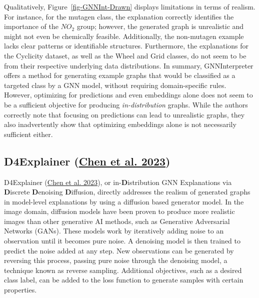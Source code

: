 \documentclass[
  11pt,
  letterpaper,
]{article}
\begin{document}
Qualitatively, Figure~\ref{fig-GNNInt-Drawn} displays limitations in
terms of realism. For instance, for the mutagen class, the explanation
correctly identifies the importance of the \(NO_2\) group; however, the
generated graph is unrealistic and might not even be chemically
feasible. Additionally, the non-mutagen example lacks clear patterns or
identifiable structures. Furthermore, the explanations for the Cyclicity
dataset, as well as the Wheel and Grid classes, do not seem to be from
their respective underlying data distributions. In summary,
GNNInterpreter offers a method for generating example graphs that would
be classified as a targeted class by a GNN model, without requiring
domain-specific rules. However, optimizing for predictions and even
embeddings alone does not seem to be a sufficient objective for
producing \emph{in-distribution} graphs. While the authors correctly
note that focusing on predictions can lead to unrealistic graphs, they
also inadvertently show that optimizing embeddings alone is not
necessarily sufficient either.

\hypertarget{d4explainer-chen_wu_gupta_ying_2023}{%
\subsection{\texorpdfstring{D4Explainer
(\protect\hyperlink{ref-Chen_Wu_Gupta_Ying_2023}{Chen et al.
2023})}{D4Explainer (Chen et al. 2023)}}\label{d4explainer-chen_wu_gupta_ying_2023}}

\quad D4Explainer (\protect\hyperlink{ref-Chen_Wu_Gupta_Ying_2023}{Chen
et al. 2023}), or in-\textbf{D}istribution GNN Explanations via
\textbf{D}iscrete \textbf{D}enoising \textbf{D}iffusion, directly
addresses the realism of generated graphs in model-level explanations by
using a diffusion based generator model. In the image domain, diffusion
models have been proven to produce more realistic images than other
generative AI methods, such as Generative Adversarial Networks (GANs).
These models work by iteratively adding noise to an observation until it
becomes pure noise. A denoising model is then trained to predict the
noise added at any step. New observations can be generated by reversing
this process, passing pure noise through the denoising model, a
technique known as reverse sampling. Additional objectives, such as a
desired class label, can be added to the loss function to generate
samples with certain properties.
\end{document}
